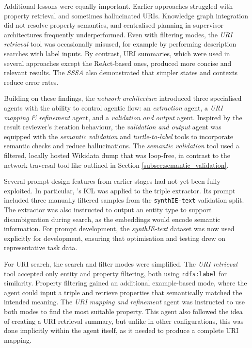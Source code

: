 \documentclass[a4paper,oneside,bibliography=totoc]{scrbook}
\begin{document}
Additional lessons were equally important. Earlier approaches struggled with property retrieval and sometimes hallucinated \acp{URI}. Knowledge graph integration did not resolve property semantics, and centralised planning in supervisor architectures frequently underperformed. Even with filtering modes, the \textit{\ac{URI} retrieval} tool was occasionally misused, for example by performing description searches with label inputs. By contrast, \ac{URI} summaries, which were used in several approaches except the ReAct-based ones, produced more concise and relevant results. The \textit{\ac{SSSA}} also demonstrated that simpler states and contexts reduce error rates.

Building on these findings, the \textit{network architecture} introduced three specialised agents with the ability to control agentic flow: an \textit{extraction} agent, a \textit{\ac{URI} mapping \& refinement} agent, and a \textit{validation and output} agent. Inspired by the result reviewer’s iteration behaviour, the \textit{validation and output} agent was equipped with the \textit{semantic validation} and \textit{turtle-to-label} tools to incorporate semantic checks and reduce hallucinations. The \textit{semantic validation} tool used a filtered, locally hosted Wikidata dump that was loop-free, in contrast to the network traversal tool like outlined in Section \ref{subsec:semantic_validation}.

Several prompt design features from earlier stages had not yet been fully exploited. In particular, \citet{Brown2020}’s \ac{ICL} was applied to the triple extractor. Its prompt included three manually filtered samples from the \texttt{synthIE-text} validation split. The extractor was also instructed to output an entity type to support disambiguation during search, as the embeddings would encode semantic information. For prompt development, the \textit{synthIE-text} dataset was now used explicitly for development, ensuring that optimisation and testing drew on representative task data.

For \ac{URI} search, the search and filter modes were simplified. The \textit{\ac{URI} retrieval} tool accepted only entity and property filtering, both using \texttt{rdfs:label} for similarity. Property filtering gained an additional example-based mode, where the agent could input a triple and retrieve properties that semantically matched the intended meaning. The \textit{\ac{URI} mapping and refinement} agent was instructed to use both modes to find the most suitable property. This agent also followed the idea of creating a \ac{URI} retrieval summary, but unlike in other configurations, this was done implicitly within the agent itself, as it needed to produce a complete \ac{URI} mapping.
\end{document}
